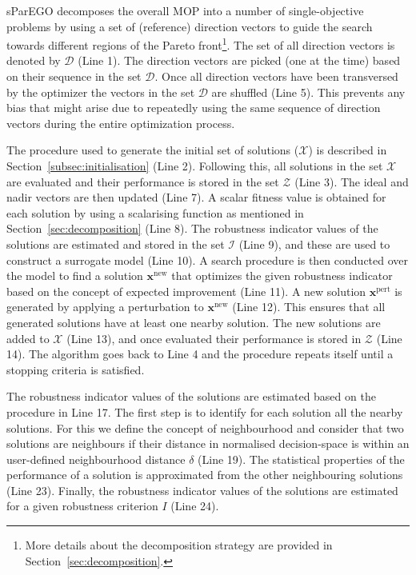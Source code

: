 \documentclass{llncs}
\newcommand{\vx}{\mathbf{x}} %
\newcommand{\DSet}{\mathcal{D}} %
\newcommand{\XSet}{\mathcal{X}} %
\newcommand{\ZSet}{\mathcal{Z}} %
\newcommand{\ISet}{\mathcal{I}} %
\begin{document}
sParEGO decomposes the overall MOP into a number of single-objective problems by using a set of (reference) direction vectors to guide the search towards different regions of the Pareto front\footnote{More details about the decomposition strategy are provided in Section~\ref{sec:decomposition}.}. The set of all direction vectors is denoted by $\DSet$ (Line 1). The direction vectors are picked (one at the time) based on their sequence in the set $\DSet$. Once all direction vectors have been transversed by the optimizer the vectors in the set $\DSet$ are shuffled (Line 5). This prevents any bias that might arise due to repeatedly using the same sequence of direction vectors during the entire optimization process. 

The procedure used to generate the initial set of solutions ($\XSet$) is described in Section~\ref{subsec:initialisation} (Line 2). Following this, all solutions in the set $\XSet$ are evaluated and their performance is stored in the set $\ZSet$ (Line 3). The ideal and nadir vectors are then updated (Line 7). A scalar fitness value is obtained for each solution by using a scalarising function as mentioned in Section~\ref{sec:decomposition} (Line 8). The robustness indicator values of the solutions are estimated and stored in the set $\ISet$ (Line 9), and these are used to construct a surrogate model (Line 10). A search procedure is then conducted over the model to find a solution $\vx^\text{new}$ that optimizes the given robustness indicator based on the concept of expected improvement (Line 11). A new solution $\vx^\text{pert}$ is generated by applying a perturbation to $\vx^\text{new}$ (Line 12). This ensures that all generated solutions have at least one nearby solution. The new solutions are added to $\XSet$ (Line 13), and once evaluated their performance is stored in $\ZSet$ (Line 14). The algorithm goes back to Line 4 and the procedure repeats itself until a stopping criteria is satisfied.

The robustness indicator values of the solutions are estimated based on the procedure in Line 17. The first step is to identify for each solution all the nearby solutions. For this we define the concept of neighbourhood and consider that two solutions are neighbours if their distance in normalised decision-space is within an user-defined neighbourhood distance $\delta$ (Line 19). The statistical properties of the performance of a solution is approximated from the other neighbouring solutions (Line 23). Finally, the robustness indicator values of the solutions are estimated for a given robustness criterion $I$ (Line 24).
\end{document}
